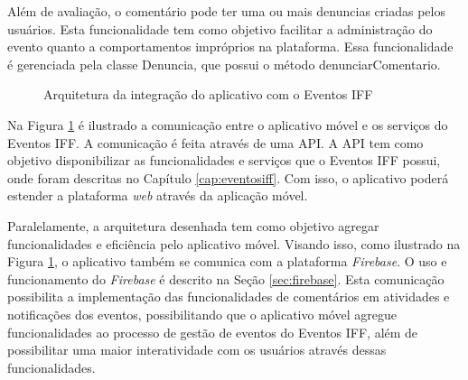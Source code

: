 Além de avaliação, o comentário pode ter uma ou mais denuncias criadas pelos usuários. Esta funcionalidade tem como objetivo facilitar a administração do evento quanto a comportamentos impróprios na plataforma. Essa funcionalidade é gerenciada pela classe Denuncia, que possui o método denunciarComentario.


\begin{figure}[H]
    \centering
    \caption{Arquitetura da integração do aplicativo com o Eventos IFF}
    \label{fig:arquitetura}
\end{figure}

Na Figura \ref{fig:arquitetura} é ilustrado a comunicação entre o aplicativo móvel e os serviços do Eventos IFF. A comunicação é feita através de uma API. A API tem como objetivo disponibilizar as funcionalidades e serviços que o Eventos IFF possui, onde foram descritas no Capítulo \ref{cap:eventosiff}. Com isso, o aplicativo poderá estender a plataforma \textit{web} através da aplicação móvel.

Paralelamente, a arquitetura desenhada tem como objetivo agregar funcionalidades e eficiência pelo aplicativo móvel. Visando isso, como ilustrado na Figura \ref{fig:arquitetura}, o aplicativo também se comunica com a plataforma \textit{Firebase}. O uso e funcionamento do \textit{Firebase} é descrito na Seção \ref{sec:firebase}. Esta comunicação possibilita a implementação das funcionalidades de comentários em atividades e notificações dos eventos, possibilitando que o aplicativo móvel agregue funcionalidades ao processo de gestão de eventos do Eventos IFF, além de possibilitar uma maior interatividade com os usuários através dessas funcionalidades.

